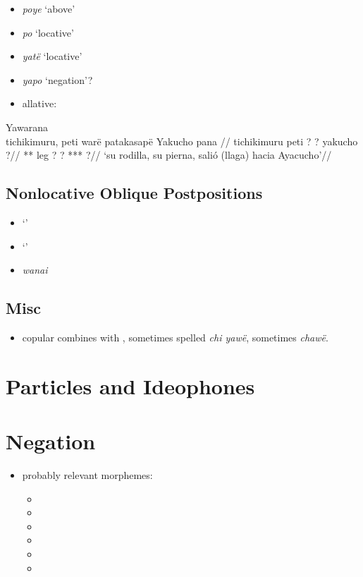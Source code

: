 \documentclass{memoir}
\begin{document}
\begin{itemize}
\item
  \emph{poye} `above'
\item
  \emph{po} `locative'
\item
  \emph{yatë} `locative'
\item
  \emph{yapo} `negation'?
\item
  allative:
\end{itemize}

\ex Yawarana \\
\label{histpajirdi-186}    \begingl
    \glpreamble  tichikimuru, peti warë patakasapë Yakucho pana //
    \gla tichikimuru peti ? ? yakucho ?//
    \glb *** leg ? ? *** ?//
        \glft ‘su rodilla, su pierna, salió (llaga) hacia Ayacucho’//  
    \endgl 
\xe

\section{Nonlocative Oblique Postpositions}

\begin{itemize}
\tightlist
\item
   `'
\item
   `'
\item
  \emph{wanai}
\end{itemize}

\section{Misc}

\begin{itemize}
\tightlist
\item
  copular  combines with , sometimes spelled
  \emph{chi yawë}, sometimes \emph{chawë}.
\end{itemize}

\chapter{\texorpdfstring{Particles and Ideophones
\label{partideo}}{Particles and Ideophones }}

\chapter{\texorpdfstring{Negation \label{negation}}{Negation }}

\begin{itemize}
\tightlist
\item
  probably relevant morphemes:

  \begin{itemize}
  \item
  \item
  \item
  \item
  \item
  \item
  \end{itemize}
\end{itemize}
\end{document}
